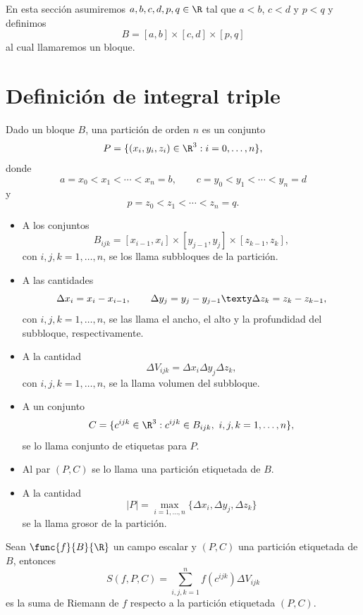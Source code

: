 \documentclass[a4,11pt]{aleph-notas}
\begin{document}
\encabezado

En esta sección asumiremos $a,b,c,d,p,q\in\R$ tal que $a<b$, $c<d$ y $p<q$ y definimos
\[
    B=[a,b]\times [c,d] \times [p,q]
\]
al cual llamaremos un bloque.

\section{Definición de integral triple}

\begin{defi}
    Dado un bloque $B$, una partición de orden $n$ es un conjunto
    \[
        P=\{(x_i,y_i,z_i)\in\R^3:i=0,\ldots,n\},
    \]
    donde
    \[
        a=x_0<x_1<\cdots<x_n=b,
    \qquad
        c=y_0<y_1<\cdots<y_n=d
    \]
    y
    \[
        p=z_0<z_1<\cdots<z_n=q.
    \]
    \begin{itemize}
    \item
        A los conjuntos
        \[
            B_{ijk}=[x_{i-1},x_i]\times[y_{j-1},y_j]\times[z_{k-1},z_k],
        \]
        con $i,j,k=1,\ldots,n$, se los llama subbloques de la partición.
    \item
        A las cantidades
        \[
            \Delta x_i=x_i-x_{i-1},
        \qquad
            \Delta y_j=y_j-y_{j-1}
        \texty
            \Delta z_k=z_k-z_{k-1},
        \]
        con $i,j,k=1,\ldots,n$, se las llama el ancho, el alto y la profundidad del subbloque, respectivamente.
    \item
        A la cantidad
        \[
            \Delta V_{ijk} = \Delta x_i\Delta y_j\Delta z_k,
        \]
        con $i,j,k=1,\ldots,n$, se la llama volumen del subbloque.
    \item
        A un conjunto
        \[
            C = \{c^{ijk}\in\R^3: c^{ijk}\in B_{ijk},\ i,j,k=1,\ldots,n\},
        \]
        se lo llama conjunto de etiquetas para $P$.
    \item
        Al par $(P,C)$ se lo llama una partición etiquetada de $B$.
    \item
        A la cantidad
        \[
            |P| = \max_{i=1,\ldots,n}\{\Delta x_i,\Delta y_j,\Delta z_k\}
        \]
        se la llama grosor de la partición.
    \end{itemize}
\end{defi}

\begin{defi}
    Sean $\func{f}{B}{\R}$ un campo escalar y $(P,C)$ una partición etiquetada de $B$, entonces
    \[
        S(f,P,C) = \sum_{i,j,k=1}^n f(c^{ijk})\Delta V_{ijk}
    \]
    es la suma de Riemann de $f$ respecto a la partición etiquetada $(P,C)$.
\end{defi}
\end{document}
